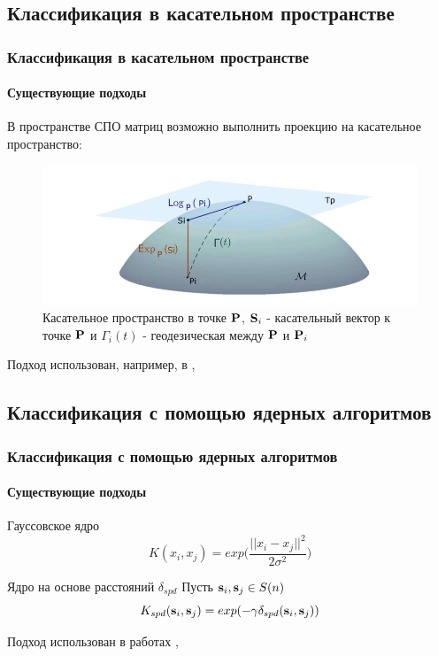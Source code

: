 \documentclass[xcolor=table]{beamer}
\newcommand{\bp}{{\bf P}}
\newcommand{\bs}{{\bf s}}
\newcommand{\bS}{{\bf S}}
\begin{document}
    \subsection[Классификация в касательном пространстве]{Классификация в касательном пространстве}
    \begin{frame}
    \frametitle{Классификация в касательном пространстве}
    \framesubtitle{Существующие подходы}
    В пространстве СПО матриц возможно выполнить проекцию на касательное пространство:
    \begin{figure}
        \centering
        \includegraphics[width=\textwidth]{img/tangent_space}
        \caption{Касательное пространство в точке $\bp$, $\bS_i$ - касательный вектор к точке $\bp$ и $\Gamma_i(t)$ - геодезическая между $\bp$ и $\bp_i$}
    \end{figure}
    Подход использован, например, в \cite{barachant2012multiclass}, \cite{barachant2013classification}
    \end{frame}
    
    \subsection[Классификация с помощью ядерных алгоритмов]{Классификация с помощью ядерных алгоритмов}
    \begin{frame}
    \frametitle{Классификация с помощью ядерных алгоритмов}
    \framesubtitle{Существующие подходы}
    \begin{block}{Гауссовское ядро}
    \begin{equation}
        \label{gaussian_kernel}
        K(x_i, x_j) = exp\Big(\frac{||x_i - x_j||^2}{2\sigma^2}\Big) 
    \end{equation}
    \end{block}
    \begin{block}{Ядро на основе расстояний $\delta_{spd}$}
    Пусть $\bs_i, \bs_j \in S(n)$
    \begin{equation}
        \label{kernel}
        K_{spd}(\bs_i, \bs_j) = exp(-\gamma \delta_{spd}(\bs_i, \bs_j))
    \end{equation}
    \end{block}
    Подход использован в работах \cite{jayasumana2013kernel}, \cite{dodero2015kernel}
    \end{frame}
\end{document}
